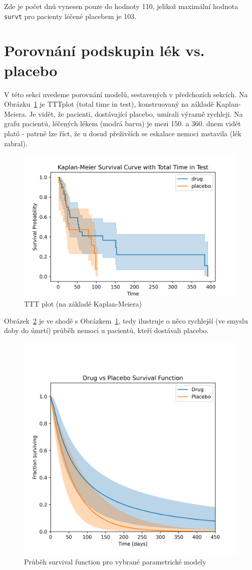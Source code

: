 \documentclass[a4, 11pt]{article}
\theoremstyle{definition}
\theoremstyle{remark}
\begin{document}
	Zde je počet dnů vynesen pouze do hodnoty 110, jelikož maximální hodnota \texttt{survt} pro pacienty léčené placebem je 103.
	
	
	\section{Porovnání podskupin lék vs. placebo} \label{sec:comparison_drug_vs_placebo}
	V této sekci uvedeme porovnání modelů, sestavených v předchozích sekcích. Na Obrázku~\ref{fig:TTTplot} je TTTplot (total time in test), konstruovaný na základě Kaplan-Meiera. 
    Je vidět, že pacienti, dostávající placebo, umírali výrazně rychleji. Na grafu pacientů, léčených lékem (modrá barva) je mezi 150. a 360. dnem vidět plató - patrně lze říct, že u dosud přeživších se eskalace nemoci zastavila (lék zabral).

	\begin{figure}[H]
        \centering
        \includegraphics[width=0.5\linewidth]{img/TTTplot_using_KM.png}
        \caption{TTT plot (na základě Kaplan-Meiera)}
        \label{fig:TTTplot}
    \end{figure}
    
    Obrázek~\ref{fig:SF_for_parametric} je ve shodě s Obrázkem~\ref{fig:TTTplot}, tedy ilustruje o něco rychlejší (ve smyslu doby do úmrtí) průběh nemoci u pacientů, kteří dostávali placebo.
    
   	\begin{figure}[H]
        \centering
        \includegraphics[width=0.5\linewidth]{img/survival_function_drug_vs_placebo_parametric.png}
        \caption{Průběh survival function pro vybrané parametrické modely}
        \label{fig:SF_for_parametric}
    \end{figure}
    
\end{document}
